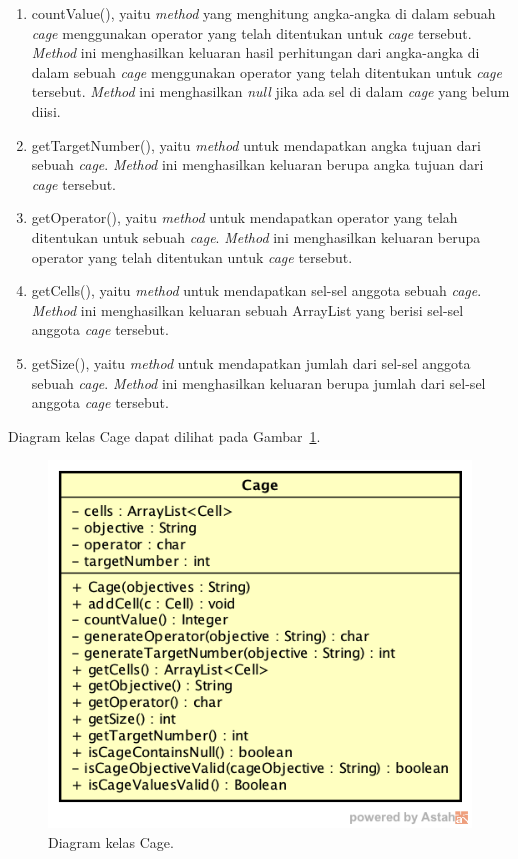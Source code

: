 \begin{enumerate}
\item countValue(), yaitu \textit{method} yang menghitung angka-angka di dalam sebuah \textit{cage} menggunakan operator yang telah ditentukan untuk \textit{cage} tersebut. \textit{Method} ini menghasilkan keluaran hasil perhitungan dari angka-angka di dalam sebuah \textit{cage} menggunakan operator yang telah ditentukan untuk \textit{cage} tersebut. \textit{Method} ini menghasilkan \textit{null} jika ada sel di dalam \textit{cage} yang belum diisi.
\item getTargetNumber(), yaitu \textit{method} untuk mendapatkan angka tujuan dari sebuah \textit{cage}. \textit{Method} ini menghasilkan keluaran berupa angka tujuan dari \textit{cage} tersebut.
\item getOperator(), yaitu \textit{method} untuk mendapatkan operator yang telah ditentukan untuk sebuah \textit{cage}. \textit{Method} ini menghasilkan keluaran berupa operator yang telah ditentukan untuk \textit{cage} tersebut.
\item getCells(), yaitu \textit{method} untuk mendapatkan sel-sel anggota sebuah \textit{cage}. \textit{Method} ini menghasilkan keluaran sebuah ArrayList yang berisi sel-sel anggota \textit{cage} tersebut.
\item getSize(), yaitu \textit{method} untuk mendapatkan jumlah dari sel-sel anggota sebuah \textit{cage}. \textit{Method} ini menghasilkan keluaran berupa jumlah dari sel-sel anggota \textit{cage} tersebut.
\end{enumerate}

Diagram kelas Cage dapat dilihat pada Gambar~\ref{fig:diagramkelascage}.

\begin{figure}
\centering
\captionsetup{justification=centering}
\includegraphics[scale=0.5]{Gambar/Perancangan/DiagramKelasCage.png}
\caption[Diagram kelas Cage.]{Diagram kelas Cage.}
\label{fig:diagramkelascage}
\end{figure}

